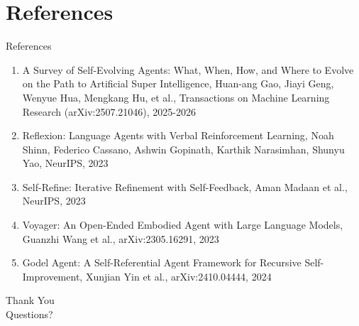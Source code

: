 \documentclass[10pt]{beamer}
\begin{document}
\section{References}
\begin{frame}[allowframebreaks]{References}
  \footnotesize
  \begin{enumerate}
    \item A Survey of Self-Evolving Agents: What, When, How, and Where to Evolve on the Path to Artificial Super Intelligence, Huan-ang Gao, Jiayi Geng, Wenyue Hua, Mengkang Hu, et al., Transactions on Machine Learning Research (arXiv:2507.21046), 2025-2026
    \item Reflexion: Language Agents with Verbal Reinforcement Learning, Noah Shinn, Federico Cassano, Ashwin Gopinath, Karthik Narasimhan, Shunyu Yao, NeurIPS, 2023
    \item Self-Refine: Iterative Refinement with Self-Feedback, Aman Madaan et al., NeurIPS, 2023
    \item Voyager: An Open-Ended Embodied Agent with Large Language Models, Guanzhi Wang et al., arXiv:2305.16291, 2023
    \item Godel Agent: A Self-Referential Agent Framework for Recursive Self-Improvement, Xunjian Yin et al., arXiv:2410.04444, 2024
  \end{enumerate}
\end{frame}

\begin{frame}[plain]
  \begin{center}
    {\Huge Thank You}\\[1em]
    {\large Questions?}
  \end{center}
\end{frame}
\end{document}
